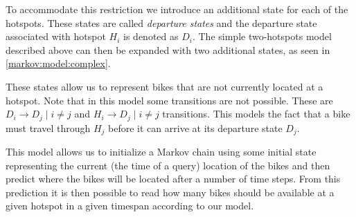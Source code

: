 To accommodate this restriction we introduce an additional state for each of the hotspots.
These states are called \emph{departure states} and the departure state associated with hotspot $H_i$ is denoted as $D_i$.
The simple two-hotspots model described above can then be expanded with two additional states, as seen in \cref{markov:model:complex}.



These states allow us to represent bikes that are not currently located at a hotspot.
Note that in this model some transitions are not possible.
These are $D_i \rightarrow D_j \mid i \neq j$ and $H_i \rightarrow D_j \mid i \neq j$ transitions.
This models the fact that a bike must travel through $H_j$ before it can arrive at its departure state $D_j$.

This model allows us to initialize a Markov chain using some initial state representing the current (the time of a query) location of the bikes and then predict where the bikes will be located after a number of time steps.
From this prediction it is then possible to read how many bikes should be available at a given hotspot in a given timespan according to our model.

